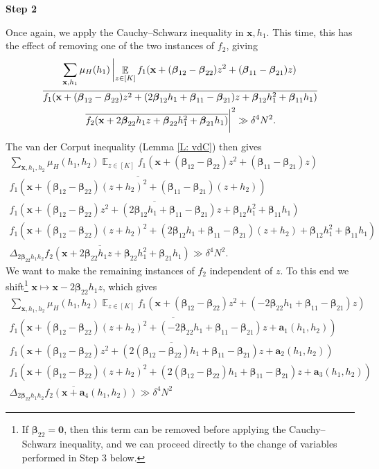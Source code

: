 \documentclass[11pt]{amsart}
\theoremstyle{definition}
\DeclareMathOperator*{\E}{\mathbb{E}}
\newcommand{\ba}{{\mathbf{a}}}
\newcommand{\bx}{{\mathbf{x}}}
\newcommand{\bbeta}{{\boldsymbol{\beta}}}
\begin{document}
\smallskip
\textbf{Step 2}
\smallskip

Once again, we apply the Cauchy--Schwarz inequality in $\bx, h_1$. This time, this has the effect of removing one of the two instances of $f_2$, giving 
\begin{multline*}
    \sum_{\bx, h_1}\mu_H(h_1)\left|\E_{z\in[K]}f_1(\bx + (\bbeta_{12}-\bbeta_{22})z^2 + (\bbeta_{11}-\bbeta_{21})z)\right.\\
    \overline{f_1(\bx + (\bbeta_{12}-\bbeta_{22})z^2 + (2\bbeta_{12}h_1+\bbeta_{11}-\bbeta_{21} )z + \bbeta_{12}h_1^2+ \bbeta_{11}h_1)}\\
    \left.\overline{f_2(\bx+2\bbeta_{22}h_1z + \bbeta_{22} h_1^2 + \bbeta_{21}h_1)}\vphantom{\E_{z\in[K]}}\right|^2\gg \delta^4 N^2.
\end{multline*}
The van der Corput inequality (Lemma \ref{L: vdC}) then gives
\begin{multline*}
    \sum_{\bx, h_1, h_2}\mu_H(h_1, h_2)\E_{z\in[K]}f_1(\bx + (\bbeta_{12}-\bbeta_{22})z^2 + (\bbeta_{11}-\bbeta_{21})z)\\
    \overline{f_1(\bx + (\bbeta_{12}-\bbeta_{22})(z+h_2)^2 + (\bbeta_{11}-\bbeta_{21})(z+h_2))}\\
    \overline{f_1(\bx + (\bbeta_{12}-\bbeta_{22})z^2 + (2\bbeta_{12}h_1+\bbeta_{11}-\bbeta_{21} )z + \bbeta_{12}h_1^2+ \bbeta_{11}h_1)}\\
    {f_1(\bx + (\bbeta_{12}-\bbeta_{22})(z+h_2)^2 + (2\bbeta_{12}h_1+\bbeta_{11}-\bbeta_{21} )(z+h_2) + \bbeta_{12}h_1^2+ \bbeta_{11}h_1)}\\
    \overline{\Delta_{2\bbeta_{22}h_1 h_2}f_2(\bx+2\bbeta_{22}h_1z + \bbeta_{22} h_1^2 + \bbeta_{21}h_1)}\gg \delta^4 N^2. 
\end{multline*}
We want to make the remaining instances of $f_2$ independent of $z$.  To this end we shift\footnote{If $\bbeta_{22}=\textbf{0}$, then this term can be removed before applying the Cauchy--Schwarz inequality, and we can proceed directly to the change of variables performed in Step 3 below.} $\bx \mapsto \bx - 2\bbeta_{22}h_1 z$, which gives
\begin{multline*}
    \sum_{\bx, h_1, h_2}\mu_H(h_1, h_2)\E_{z\in[K]}f_1(\bx + (\bbeta_{12}-\bbeta_{22})z^2 + (-2\bbeta_{22}h_1+\bbeta_{11}-\bbeta_{21})z)\\
    \overline{f_1(\bx + (\bbeta_{12}-\bbeta_{22})(z+h_2)^2 + (-2\bbeta_{22}h_1+\bbeta_{11}-\bbeta_{21})z + \ba_1(h_1, h_2))}\\
    \overline{f_1(\bx + (\bbeta_{12}-\bbeta_{22})z^2 + (2(\bbeta_{12}-\bbeta_{22})h_1+\bbeta_{11}-\bbeta_{21} )z + \ba_2(h_1,h_2))}\\
    {f_1(\bx + (\bbeta_{12}-\bbeta_{22})(z+h_2)^2 + (2(\bbeta_{12}-\bbeta_{22})h_1+\bbeta_{11}-\bbeta_{21} )z +  \ba_3(h_1,h_2))}\\
    \overline{\Delta_{2\bbeta_{22}h_1 h_2}f_2(\bx+\ba_4(h_1, h_2))}\gg \delta^4 N^2
\end{multline*}
\end{document}
